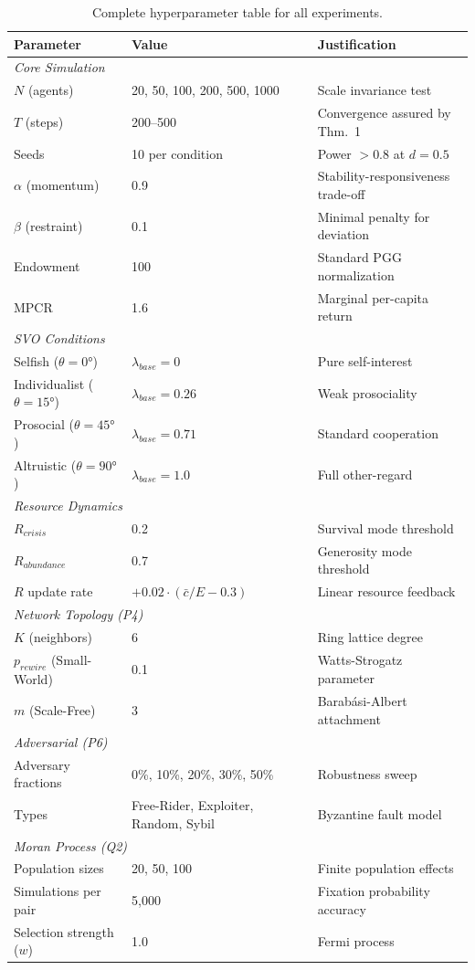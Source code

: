 \documentclass{article}
\begin{document}
\begin{table}[h]
\centering
\caption{Complete hyperparameter table for all experiments.}
\begin{tabular}{lll}
\toprule
Parameter & Value & Justification \\
\midrule
\multicolumn{3}{l}{\textit{Core Simulation}} \\
$N$ (agents) & 20, 50, 100, 200, 500, 1000 & Scale invariance test \\
$T$ (steps) & 200--500 & Convergence assured by Thm.~1 \\
Seeds & 10 per condition & Power $> 0.8$ at $d = 0.5$ \\
$\alpha$ (momentum) & 0.9 & Stability-responsiveness trade-off \\
$\beta$ (restraint) & 0.1 & Minimal penalty for deviation \\
Endowment & 100 & Standard PGG normalization \\
MPCR & 1.6 & Marginal per-capita return \\
\midrule
\multicolumn{3}{l}{\textit{SVO Conditions}} \\
Selfish ($\theta = 0°$) & $\lambda_{base} = 0$ & Pure self-interest \\
Individualist ($\theta = 15°$) & $\lambda_{base} = 0.26$ & Weak prosociality \\
Prosocial ($\theta = 45°$) & $\lambda_{base} = 0.71$ & Standard cooperation \\
Altruistic ($\theta = 90°$) & $\lambda_{base} = 1.0$ & Full other-regard \\
\midrule
\multicolumn{3}{l}{\textit{Resource Dynamics}} \\
$R_{crisis}$ & 0.2 & Survival mode threshold \\
$R_{abundance}$ & 0.7 & Generosity mode threshold \\
$R$ update rate & $+0.02 \cdot (\bar{c}/E - 0.3)$ & Linear resource feedback \\
\midrule
\multicolumn{3}{l}{\textit{Network Topology (P4)}} \\
$K$ (neighbors) & 6 & Ring lattice degree \\
$p_{rewire}$ (Small-World) & 0.1 & Watts-Strogatz parameter \\
$m$ (Scale-Free) & 3 & Barab\'{a}si-Albert attachment \\
\midrule
\multicolumn{3}{l}{\textit{Adversarial (P6)}} \\
Adversary fractions & 0\%, 10\%, 20\%, 30\%, 50\% & Robustness sweep \\
Types & Free-Rider, Exploiter, Random, Sybil & Byzantine fault model \\
\midrule
\multicolumn{3}{l}{\textit{Moran Process (Q2)}} \\
Population sizes & 20, 50, 100 & Finite population effects \\
Simulations per pair & 5,000 & Fixation probability accuracy \\
Selection strength ($w$) & 1.0 & Fermi process \\
\bottomrule
\end{tabular}
\end{table}
\end{document}
